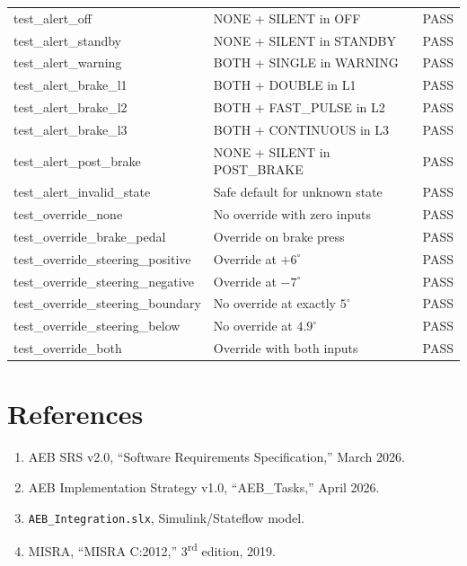 \documentclass[12pt]{article}
\begin{document}
\begin{table}[H]
\begin{tabularx}{\textwidth}{|>{\raggedright\arraybackslash}p{3.8cm}
                              |>{\raggedright\arraybackslash}X
                              |>{\centering\arraybackslash}p{1.0cm}|}
\multicolumn{3}{|c|}{\cellcolor{blue!5}\textit{test\_alert.c --- 27 assertions}} \\ \hline
test\_alert\_off & NONE + SILENT in OFF & PASS \\ \hline
test\_alert\_standby & NONE + SILENT in STANDBY & PASS \\ \hline
test\_alert\_warning & BOTH + SINGLE in WARNING & PASS \\ \hline
test\_alert\_brake\_l1 & BOTH + DOUBLE in L1 & PASS \\ \hline
test\_alert\_brake\_l2 & BOTH + FAST\_PULSE in L2 & PASS \\ \hline
test\_alert\_brake\_l3 & BOTH + CONTINUOUS in L3 & PASS \\ \hline
test\_alert\_post\_brake & NONE + SILENT in POST\_BRAKE & PASS \\ \hline
test\_alert\_invalid\_state & Safe default for unknown state & PASS \\ \hline
test\_override\_none & No override with zero inputs & PASS \\ \hline
test\_override\_brake\_pedal & Override on brake press & PASS \\ \hline
test\_override\_steering\_positive & Override at $+6^{\circ}$ & PASS \\ \hline
test\_override\_steering\_negative & Override at $-7^{\circ}$ & PASS \\ \hline
test\_override\_steering\_boundary & No override at exactly $5^{\circ}$ & PASS \\ \hline
test\_override\_steering\_below & No override at $4.9^{\circ}$ & PASS \\ \hline
test\_override\_both & Override with both inputs & PASS \\ \hline

\end{tabularx}
\end{table}

\vfill

\section*{References}
\begin{enumerate}[itemsep=2pt]
    \item AEB SRS v2.0, ``Software Requirements Specification,'' March 2026.
    \item AEB Implementation Strategy v1.0, ``AEB\_Tasks,'' April 2026.
    \item \texttt{AEB\_Integration.slx}, Simulink/Stateflow model.
    \item MISRA, ``MISRA C:2012,'' 3\textsuperscript{rd} edition, 2019.
\end{enumerate}
\end{document}

